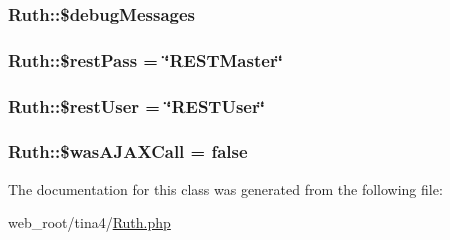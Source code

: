 \subsubsection[{\$debug\+Messages}]{\setlength{\rightskip}{0pt plus 5cm}Ruth\+::\$debug\+Messages\hspace{0.3cm}{\ttfamily [static]}}\label{classRuth_abcc2411c11abe0c3675069f255db1f97}
\hypertarget{classRuth_ab4e553a88d7384c2dd07158efe3dd933}{}
\subsubsection[{\$rest\+Pass}]{\setlength{\rightskip}{0pt plus 5cm}Ruth\+::\$rest\+Pass = \char`\"{}R\+E\+S\+T\+Master\char`\"{}\hspace{0.3cm}{\ttfamily [static]}}\label{classRuth_ab4e553a88d7384c2dd07158efe3dd933}
\hypertarget{classRuth_abe139defb62f176c0a077983561f9d86}{}
\subsubsection[{\$rest\+User}]{\setlength{\rightskip}{0pt plus 5cm}Ruth\+::\$rest\+User = \char`\"{}R\+E\+S\+T\+User\char`\"{}\hspace{0.3cm}{\ttfamily [static]}}\label{classRuth_abe139defb62f176c0a077983561f9d86}
\hypertarget{classRuth_aaaf0e436f08cbd148c492584832da4cc}{}
\subsubsection[{\$was\+A\+J\+A\+X\+Call}]{\setlength{\rightskip}{0pt plus 5cm}Ruth\+::\$was\+A\+J\+A\+X\+Call = false\hspace{0.3cm}{\ttfamily [static]}}\label{classRuth_aaaf0e436f08cbd148c492584832da4cc}


The documentation for this class was generated from the following file\+:\begin{DoxyCompactItemize}
\item 
web\+\_\+root/tina4/\hyperlink{Ruth_8php}{Ruth.\+php}\end{DoxyCompactItemize}
